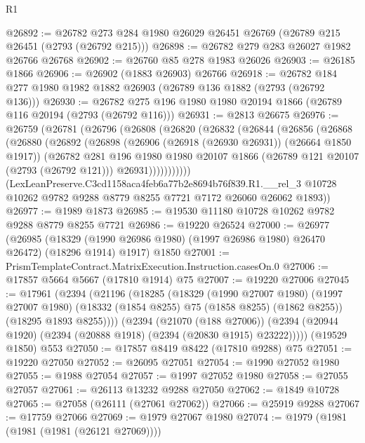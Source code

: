 \begin{lexlean}{R1}
\begin{coremodule}
@26892 := @26782 @273 @284 @1980 @26029 @26451 @26769 (@26789 @215 @26451 (@2793 (@26792 @215)))
@26898 := @26782 @279 @283 @26027 @1982 @26766 @26768
@26902 := @26760 @85 @278 @1983 @26026
@26903 := @26185 @1866
@26906 := @26902 (@1883 @26903) @26766
@26918 := @26782 @184 @277 @1980 @1982 @1882 @26903 (@26789 @136 @1882 (@2793 (@26792 @136)))
@26930 := @26782 @275 @196 @1980 @1980 @20194 @1866 (@26789 @116 @20194 (@2793 (@26792 @116)))
@26931 := @2813 @26675
@26976 := @26759
    (@26781
      (@26796
        (@26808
          (@26820
            (@26832
              (@26844
                (@26856
                  (@26868
                    (@26880
                      (@26892
                        (@26898
                          (@26906 (@26918 (@26930 @26931)) (@26664 @1850 @1917))
                          (@26782
                            @281
                            @196
                            @1980
                            @1980
                            @20107
                            @1866
                            (@26789 @121 @20107 (@2793 (@26792 @121)))
                            @26931)))))))))))
      (LexLeanPreserve.C3cd1158aca4feb6a77b2e8694b76f839.R1.__rel_3
        @10728
        @10262
        @9782
        @9288
        @8779
        @8255
        @7721
        @7172
        @26060
        @26062
        @1893))
@26977 := @1989 @1873
@26985 := @19530 @11180 @10728 @10262 @9782 @9288 @8779 @8255 @7721
@26986 := @19220 @26524
@27000 := @26977
    (@26985 (@18329 (@1990 @26986 @1980) (@1997 @26986 @1980) @26470 @26472) (@18296 @1914) @1917)
    @1850
@27001 := PrismTemplateContract.MatrixExecution.Instruction.casesOn.{0}
@27006 := @17857 @5664 @5667 (@17810 @1914) @75
@27007 := @19220 @27006
@27045 := @17961
    (@2394
      (@21196
        (@18285
          (@18329
            (@1990 @27007 @1980)
            (@1997 @27007 @1980)
            (@18332 (@1854 @8255) @75 (@1858 @8255) (@1862 @8255))
            (@18295 @1893 @8255))))
      (@2394
        (@21070 (@188 @27006))
        (@2394 (@20944 @1920) (@2394 (@20888 @1918) (@2394 (@20830 @1915) @23222)))))
    (@19529 @1850)
    @553
@27050 := @17857 @8419 @8422 (@17810 @9288) @75
@27051 := @19220 @27050
@27052 := @26095 @27051
@27054 := @1990 @27052 @1980
@27055 := @1988 @27054
@27057 := @1997 @27052 @1980
@27058 := @27055 @27057
@27061 := @26113 @13232 @9288 @27050
@27062 := @1849 @10728
@27065 := @27058 (@26111 (@27061 @27062))
@27066 := @25919 @9288
@27067 := @17759 @27066
@27069 := @1979 @27067 @1980
@27074 := @1979 (@1981 (@1981 (@1981 (@26121 @27069))))

\end{coremodule}
\end{lexlean}
